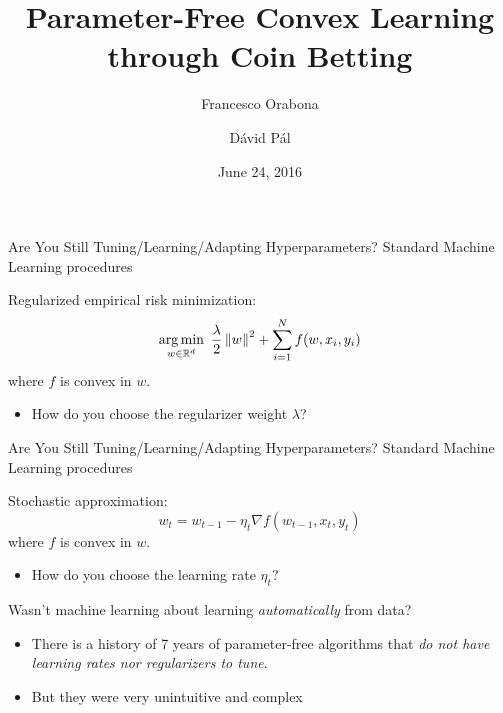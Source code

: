 \documentclass{beamer}
\title{Parameter-Free Convex Learning through Coin Betting}
\author{Francesco Orabona \and D\'avid P\'al}
\institute[] %
{
Yahoo Research, New York
}
\date[June 24, 2016]{June 24, 2016}
\newcommand{\grad}{\nabla}
\begin{document}
%
%
\begin{frame}{Are You Still Tuning/Learning/Adapting Hyperparameters?}
	Standard Machine Learning procedures

	\vspace{1cm}

	Regularized empirical risk minimization:
	\[
	\operatorname*{arg\,min}_{w \in \mathbb{R}^d} \ \frac{\lambda}{2} \left\|{w}\right\|^2 + \sum_{i=1}^N f(w, x_i, y_i)
	\]
	where $f$ is convex in $w$.
	\begin{itemize}
	\item<2> How do you choose the regularizer weight $\lambda$?
	\end{itemize}
\end{frame}
%
%
\begin{frame}{Are You Still Tuning/Learning/Adapting Hyperparameters?}
	Standard Machine Learning procedures

	\vspace{1cm}

	Stochastic approximation:
	\[
	w_t = w_{t-1} - \eta_t \grad f(w_{t-1}, x_t, y_t)
	\]
	where $f$ is convex in $w$.
	\begin{itemize}
	\item<2> How do you choose the learning rate $\eta_t$?
	\end{itemize}
\end{frame}
%
%
\begin{frame}{Wasn't machine learning about learning \emph{automatically} from data?}

\begin{itemize}
\item There is a history of 7 years of parameter-free algorithms that \emph{do not have learning rates nor regularizers to tune}.
\item But they were very unintuitive and complex
\end{itemize}
\end{frame}
%
%
\end{document}
